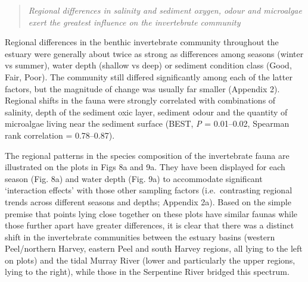 \documentclass[
]{book}
\begin{document}
\begin{quote}
\emph{Regional differences in salinity and sediment oxygen, odour and microalgae exert the greatest influence on the invertebrate community}
\end{quote}

Regional differences in the benthic invertebrate community throughout the estuary were generally about twice as strong as differences among seasons (winter vs summer), water depth (shallow vs deep) or sediment condition class (Good, Fair, Poor). The community still differed significantly among each of the latter factors, but the magnitude of change was usually far smaller (Appendix 2). Regional shifts in the fauna were strongly correlated with combinations of salinity, depth of the sediment oxic layer, sediment odour and the quantity of microalgae living near the sediment surface (BEST, \emph{P} = 0.01--0.02, Spearman rank correlation = 0.78--0.87).

The regional patterns in the species composition of the invertebrate fauna are illustrated on the plots in Figs 8a and 9a. They have been displayed for each season (Fig. 8a) and water depth (Fig. 9a) to accommodate significant `interaction effects' with those other sampling factors (i.e.~contrasting regional trends across different seasons and depths; Appendix 2a). Based on the simple premise that points lying close together on these plots have similar faunas while those further apart have greater differences, it is clear that there was a distinct shift in the invertebrate communities between the estuary basins (western Peel/northern Harvey, eastern Peel and south Harvey regions, all lying to the left on plots) and the tidal Murray River (lower and particularly the upper regions, lying to the right), while those in the Serpentine River bridged this spectrum.~
\end{document}

